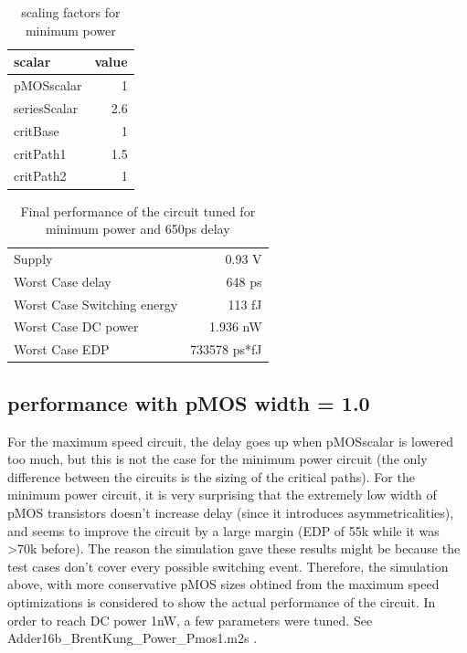 \documentclass[english]{article}
\begin{document}
\begin{table}[h]
\centering
\begin{tabular}{ |l|r| }
\hline
scalar	& value \\
\hline
 pMOSscalar		& 1 \\
 seriesScalar   & 2.6 \\
 critBase   	& 1 \\
 critPath1   	& 1.5 \\
 critPath2    	& 1 \\
\hline
\end{tabular}
\caption{scaling factors for minimum power}
\label{MinPowerScalars}
\end{table}

\begin{table}[h]
\centering
\begin{tabular}{ |l|r| }
\hline
Supply	&	0.93 V \\
Worst Case delay &            648 ps \\
Worst Case Switching energy & 113 fJ\\
Worst Case DC power &        1.936 nW \\
Worst Case EDP &              733578 ps*fJ \\
\hline
\end{tabular}
\caption{Final performance of the circuit tuned for minimum power and 650ps delay}
\label{PowerPerformance}
\end{table}   


\subsection{performance with pMOS width = 1.0}

For the maximum speed circuit, the delay goes up when pMOSscalar is lowered too much, but this is not the case for the minimum power circuit (the only difference between the circuits is the sizing of the critical paths).
For the minimum power circuit, it is very surprising that the extremely low width of pMOS transistors doesn't increase delay (since it introduces asymmetricalities), and seems to improve the circuit by a large margin (EDP of 55k while it was \textgreater 70k before). The reason the simulation gave these results might be because the test cases don't cover every possible switching event. 
Therefore, the simulation above, with more conservative pMOS sizes obtined from the maximum speed optimizations is considered to show the actual performance of the circuit.
In order to reach DC power \textlesser 1nW, a few parameters were tuned. See Adder16b_BrentKung_Power_Pmos1.m2s .
\end{document}
